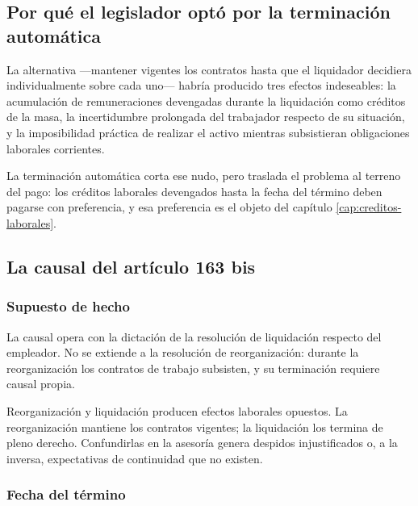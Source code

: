 \subsection{Por qué el legislador optó por la terminación automática}

La alternativa ---mantener vigentes los contratos hasta que el liquidador decidiera
individualmente sobre cada uno--- habría producido tres efectos indeseables: la
acumulación de remuneraciones devengadas durante la liquidación como créditos de la masa,
la incertidumbre prolongada del trabajador respecto de su situación, y la imposibilidad
práctica de realizar el activo mientras subsistieran obligaciones laborales corrientes.

La terminación automática corta ese nudo, pero traslada el problema al terreno del pago:
los créditos laborales devengados hasta la fecha del término deben pagarse con
preferencia, y esa preferencia es el objeto del capítulo \ref{cap:creditos-laborales}.

\bloqueNormativo

\subsection{La causal del artículo 163 bis}

\subsubsection{Supuesto de hecho}

La causal opera con la dictación de la resolución de liquidación respecto del empleador.
No se extiende a la resolución de reorganización: durante la reorganización los contratos
de trabajo subsisten, y su terminación requiere causal propia.

\begin{alerta}
Reorganización y liquidación producen efectos laborales opuestos. La reorganización
mantiene los contratos vigentes; la liquidación los termina de pleno derecho. Confundirlas
en la asesoría genera despidos injustificados o, a la inversa, expectativas de
continuidad que no existen.
\end{alerta}

\subsubsection{Fecha del término}

